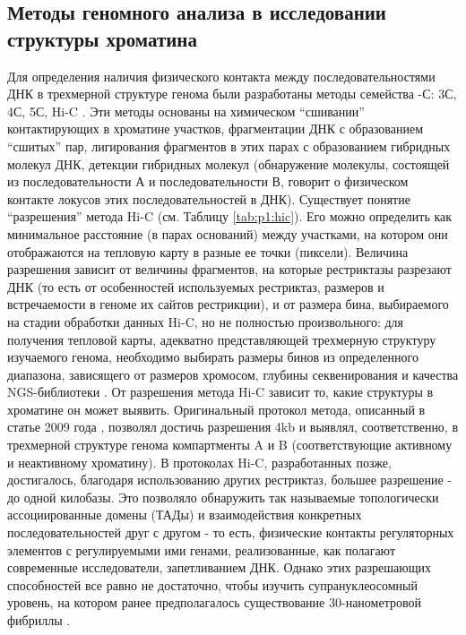 \subsection{Методы геномного анализа в исследовании структуры хроматина}

    Для определения наличия физического контакта между последовательностями ДНК в трехмерной структуре генома были разработаны методы семейства -С: 3С, 4С, 5С, Hi-C \cite{fraser_overview_2015}. Эти методы основаны на химическом ``сшивании'' контактирующих в хроматине участков, фрагментации ДНК с образованием ``сшитых'' пар, лигирования фрагментов в этих парах с образованием гибридных молекул ДНК, детекции гибридных молекул (обнаружение молекулы, состоящей из последовательности А и последовательности В, говорит о физическом контакте локусов этих последовательностей в ДНК).
    Существует понятие ``разрешения'' метода Hi-C (см. Таблицу \ref{tab:p1:hic}). Его можно определить как минимальное расстояние (в парах оснований) между участками, на котором они отображаются на тепловую карту в разные ее точки (пиксели). Величина разрешения зависит от величины фрагментов, на которые рестриктазы разрезают ДНК (то есть от особенностей используемых рестриктаз, размеров и встречаемости в геноме их сайтов рестрикции), и от размера бина, выбираемого на стадии обработки данных Hi-C, но не полностью произвольного: для получения тепловой карты, адекватно представляющей трехмерную структуру изучаемого генома, необходимо выбирать размеры бинов из определенного диапазона, зависящего от размеров хромосом, глубины секвенирования и качества NGS-библиотеки \cite{pal_hi-c_2019}. От разрешения метода Hi-C зависит то, какие структуры в хроматине он может выявить. Оригинальный протокол метода, описанный в статье 2009 года \cite{lieberman-aiden_comprehensive_2009}, позволял достичь разрешения 4kb и выявлял, соответственно, в трехмерной структуре генома компартменты A и B (соответствующие активному и неактивному хроматину). В протоколах Hi-C, разработанных позже, достигалось, благодаря использованию других рестриктаз, большее разрешение - до одной килобазы. Это позволяло обнаружить так называемые топологически ассоциированные домены (ТАДы) \cite{dixon_topological_2012} и взаимодействия конкретных последовательностей друг с другом - то есть, физические контакты регуляторных элементов с регулируемыми ими генами, реализованные, как полагают современные исследователи, запетливанием ДНК. Однако этих разрешающих способностей все равно не достаточно, чтобы изучить супрануклеосомный уровень, на котором ранее предполагалось существование 30-нанометровой фибриллы \cite{pal_hi-c_2019}.
    
